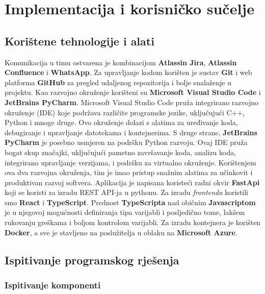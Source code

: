 \chapter{Implementacija i korisničko sučelje}
		
		
		\section{Korištene tehnologije i alati}
		
			Komunikacija u timu ostvarena je kombinacijom \textbf{Atlassin Jira}, \textbf{Atlassin Confluence} i \textbf{WhatsApp}. Za upravljanje kodom korišten je sustav \textbf{Git} i web platforma \textbf{GitHub} za pregled udaljenog repozitorija i bolje snalaženje u projektu.
			Kao razvojno okruženje korišteni su \textbf{Microsoft Visual Studio Code} i \textbf{JetBrains PyCharm}. Microsoft Visual Studio Code pruža integrirano razvojno okruženje (IDE) koje podržava različite programske jezike, uključujući C++, Python i mnoge druge. Ovo okruženje dolazi s alatima za uređivanje koda, debugiranje i upravljanje datotekama i kontejnerima.
			S druge strane, \textbf{JetBrains PyCharm} je posebno usmjeren na podršku Python razvoju. Ovaj IDE pruža bogat skup značajki, uključujući pametno završavanje koda, analizu koda, integrirano upravljanje verzijama, i podršku za virtualno okruženje. Korištenjem ova dva razvojna okruženja, tim je imao pristup snažnim alatima za učinkovit i produktivan razvoj softvera.
			Aplikacija je napisana koristeći radni okvir \textbf{FastApi} koji se koristi za izradu REST API-ja u pythonu. Za izradu \textit{frontenda} koristili smo \textbf{React} i \textbf{TypeScript}. Prednost \textbf{TypeScripta} nad običnim \textbf{Javascriptom} je u njegovoj mogućnosti definiranja tipa varijabli i posljedično tome, lakšem rukovanju greškama i boljom kontrolom varijabli.
			Za izradu kontejnera je korišten \textbf{Docker}, a sve je stavljeno na poslužitelja u oblaku na \textbf{Microsoft Azure}.
			
			
			
			\eject 
		
	
		\section{Ispitivanje programskog rješenja}
			
			
			\subsection{Ispitivanje komponenti}
			
